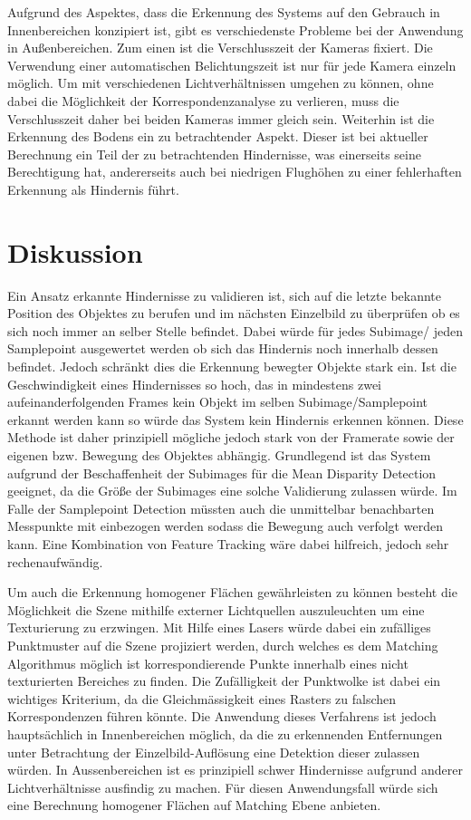 \noindent
Aufgrund des Aspektes, dass die Erkennung des Systems auf den Gebrauch in Innenbereichen konzipiert ist, gibt es verschiedenste Probleme bei der Anwendung in Außenbereichen. Zum einen ist die Verschlusszeit der Kameras fixiert. Die Verwendung einer automatischen Belichtungszeit ist nur für jede Kamera einzeln möglich. Um mit verschiedenen Lichtverhältnissen umgehen zu können, ohne dabei die Möglichkeit der Korrespondenzanalyse zu verlieren, muss die Verschlusszeit daher bei beiden Kameras immer gleich sein. Weiterhin ist die Erkennung des Bodens ein zu betrachtender Aspekt. Dieser ist bei aktueller Berechnung ein Teil der zu betrachtenden Hindernisse, was einerseits seine Berechtigung hat, andererseits auch bei niedrigen Flughöhen zu einer fehlerhaften Erkennung als Hindernis führt. 


\section{Diskussion}
\label{sec:conflict_discussion}
Ein Ansatz erkannte Hindernisse zu validieren ist, sich auf die letzte bekannte Position des Objektes zu berufen und im nächsten Einzelbild zu überprüfen ob es sich noch immer an selber Stelle befindet. Dabei würde für jedes Subimage/ jeden Samplepoint ausgewertet werden ob sich das Hindernis noch innerhalb dessen befindet. Jedoch schränkt dies die Erkennung bewegter Objekte stark ein. Ist die Geschwindigkeit eines Hindernisses so hoch, das in mindestens zwei aufeinanderfolgenden Frames kein Objekt im selben Subimage/Samplepoint erkannt werden kann so würde das System kein Hindernis erkennen können. Diese Methode ist daher prinzipiell mögliche jedoch stark von der Framerate sowie der eigenen bzw. Bewegung des Objektes abhängig. Grundlegend ist das System aufgrund der Beschaffenheit der Subimages für die Mean Disparity Detection geeignet, da die Größe der Subimages eine solche Validierung zulassen würde. Im Falle der Samplepoint Detection müssten auch die unmittelbar benachbarten Messpunkte mit einbezogen werden sodass die Bewegung auch verfolgt werden kann. Eine Kombination von Feature Tracking wäre dabei hilfreich, jedoch sehr rechenaufwändig.

Um auch die Erkennung homogener Flächen gewährleisten zu können besteht die Möglichkeit die Szene mithilfe externer Lichtquellen auszuleuchten um eine Texturierung zu erzwingen. Mit Hilfe eines Lasers würde dabei ein zufälliges Punktmuster auf die Szene projiziert werden, durch welches es dem Matching Algorithmus möglich ist korrespondierende Punkte innerhalb eines nicht texturierten Bereiches zu finden. Die Zufälligkeit der Punktwolke ist dabei ein wichtiges Kriterium, da die Gleichmässigkeit eines Rasters zu falschen Korrespondenzen führen könnte. Die Anwendung dieses Verfahrens ist jedoch hauptsächlich in Innenbereichen möglich, da die zu erkennenden Entfernungen unter Betrachtung der Einzelbild-Auflösung eine Detektion dieser zulassen würden. In Aussenbereichen ist es prinzipiell schwer Hindernisse aufgrund anderer Lichtverhältnisse ausfindig zu machen. Für diesen Anwendungsfall würde sich eine Berechnung homogener Flächen auf Matching Ebene anbieten.

